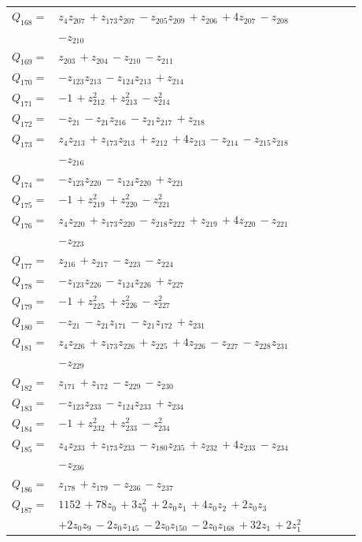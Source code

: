 \begin{longtable}{@{}r p{0.88\linewidth}@{}}
$Q_{168}=$ & $z_{4}z_{207}\,+z_{173}z_{207}\,-z_{205}z_{209}\,+z_{206}\,+4z_{207}\,-z_{208}$\\
 & $-z_{210}$\\[5pt]
$Q_{169}=$ & $z_{203}\,+z_{204}\,-z_{210}\,-z_{211}$\\[5pt]
$Q_{170}=$ & $-z_{123}z_{213}\,-z_{124}z_{213}\,+z_{214}$\\[5pt]
$Q_{171}=$ & $-1\,+z_{212}^{2}\,+z_{213}^{2}\,-z_{214}^{2}$\\[5pt]
$Q_{172}=$ & $-z_{21}\,-z_{21}z_{216}\,-z_{21}z_{217}\,+z_{218}$\\[5pt]
$Q_{173}=$ & $z_{4}z_{213}\,+z_{173}z_{213}\,+z_{212}\,+4z_{213}\,-z_{214}\,-z_{215}z_{218}$\\
 & $-z_{216}$\\[5pt]
$Q_{174}=$ & $-z_{123}z_{220}\,-z_{124}z_{220}\,+z_{221}$\\[5pt]
$Q_{175}=$ & $-1\,+z_{219}^{2}\,+z_{220}^{2}\,-z_{221}^{2}$\\[5pt]
$Q_{176}=$ & $z_{4}z_{220}\,+z_{173}z_{220}\,-z_{218}z_{222}\,+z_{219}\,+4z_{220}\,-z_{221}$\\
 & $-z_{223}$\\[5pt]
$Q_{177}=$ & $z_{216}\,+z_{217}\,-z_{223}\,-z_{224}$\\[5pt]
$Q_{178}=$ & $-z_{123}z_{226}\,-z_{124}z_{226}\,+z_{227}$\\[5pt]
$Q_{179}=$ & $-1\,+z_{225}^{2}\,+z_{226}^{2}\,-z_{227}^{2}$\\[5pt]
$Q_{180}=$ & $-z_{21}\,-z_{21}z_{171}\,-z_{21}z_{172}\,+z_{231}$\\[5pt]
$Q_{181}=$ & $z_{4}z_{226}\,+z_{173}z_{226}\,+z_{225}\,+4z_{226}\,-z_{227}\,-z_{228}z_{231}$\\
 & $-z_{229}$\\[5pt]
$Q_{182}=$ & $z_{171}\,+z_{172}\,-z_{229}\,-z_{230}$\\[5pt]
$Q_{183}=$ & $-z_{123}z_{233}\,-z_{124}z_{233}\,+z_{234}$\\[5pt]
$Q_{184}=$ & $-1\,+z_{232}^{2}\,+z_{233}^{2}\,-z_{234}^{2}$\\[5pt]
$Q_{185}=$ & $z_{4}z_{233}\,+z_{173}z_{233}\,-z_{180}z_{235}\,+z_{232}\,+4z_{233}\,-z_{234}$\\
 & $-z_{236}$\\[5pt]
$Q_{186}=$ & $z_{178}\,+z_{179}\,-z_{236}\,-z_{237}$\\[5pt]
$Q_{187}=$ & $1152\,+78z_{0}\,+3z_{0}^{2}\,+2z_{0}z_{1}\,+4z_{0}z_{2}\,+2z_{0}z_{3}$\\
 & $+2z_{0}z_{9}\,-2z_{0}z_{145}\,-2z_{0}z_{150}\,-2z_{0}z_{168}\,+32z_{1}\,+2z_{1}^{2}$\\

\end{longtable}
